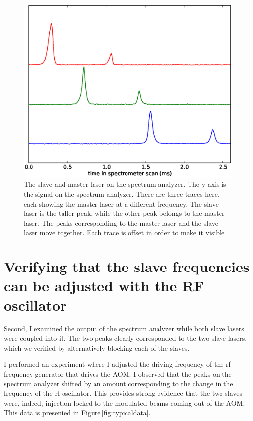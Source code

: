 \begin{figure}
    \centerline{\includegraphics{Slave2AndMasterScanningMaster}}
    \caption[Slave laser and master laser frequencies tracking together]{\label{fig:slaveMaster}
    The slave and master laser on the spectrum analyzer. The y axis is the signal on the spectrum analyzer. There are three traces here, each showing the master laser at a different frequency. The slave laser is the taller peak, while the other peak belongs to the master laser. The peaks corresponding to the master laser and the slave laser move together. Each trace is offset in order to make it visible}
\end{figure}

\section{Verifying that the slave frequencies can be adjusted with the RF oscillator}
Second, I examined the output of the spectrum analyzer while both slave lasers were coupled into it. 
The two peaks clearly corresponded to the two slave lasers, which we verified by alternatively blocking each of the slaves. 


I performed an experiment where I adjusted the driving frequency of the rf frequency generator that drives the AOM. I observed that the peaks on the spectrum analyzer shifted by an amount corresponding to the change in the frequency of the rf oscillator. This provides strong evidence that the two slaves were, indeed, injection locked to the modulated beams coming out of the AOM. This data is presented in Figure\,\ref{fig:typicaldata}.


